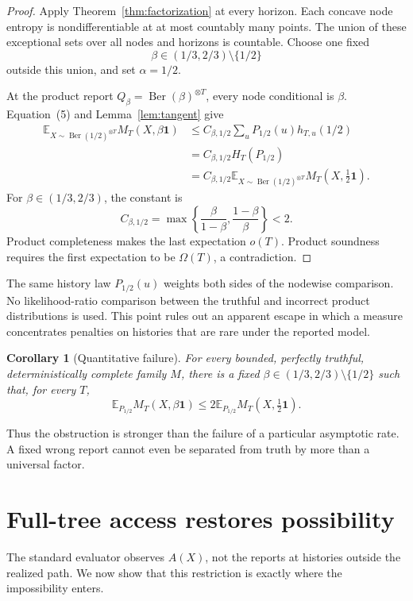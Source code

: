 \documentclass{article}
\newtheorem{corollary}[theorem]{Corollary}
\theoremstyle{definition}
\theoremstyle{remark}
\newcommand{\Ber}{\operatorname{Ber}}
\newcommand{\E}{\mathbb E}
\newcommand{\1}{\mathbf 1}
\begin{document}
\begin{proof}
Apply Theorem~\ref{thm:factorization} at every horizon. Each concave node entropy is nondifferentiable at at most countably many points. The union of these exceptional sets over all nodes and horizons is countable. Choose one fixed \[ \beta\in(1/3,2/3)\setminus\{1/2\} \] outside this union, and set \(\alpha=1/2\).

At the product report \(Q_\beta=\Ber(\beta)^{\otimes T}\), every node conditional is \(\beta\). Equation~(5) and Lemma~\ref{lem:tangent} give
\begin{align*}
\E_{X\sim\Ber(1/2)^{\otimes T}}M_T(X,\beta\1)
&\le C_{\beta,1/2}\sum_u P_{1/2}(u)h_{T,u}(1/2)\\
&=C_{\beta,1/2}H_T(P_{1/2})\\
&=C_{\beta,1/2}\E_{X\sim\Ber(1/2)^{\otimes T}}M_T(X,\tfrac12\1).
\end{align*}
For \(\beta\in(1/3,2/3)\), the constant is \[ C_{\beta,1/2}=\max\left\{\frac{\beta}{1-\beta},\frac{1-\beta}{\beta}\right\}<2. \] Product completeness makes the last expectation \(o(T)\). Product soundness requires the first expectation to be \(\Omega(T)\), a contradiction.
\end{proof}

The same history law \(P_{1/2}(u)\) weights both sides of the nodewise comparison. No likelihood-ratio comparison between the truthful and incorrect product distributions is used. This point rules out an apparent escape in which a measure concentrates penalties on histories that are rare under the reported model.

\begin{corollary}[Quantitative failure]\label{cor:quantitative}
For every bounded, perfectly truthful, deterministically complete family \(M\), there is a fixed \(\beta\in(1/3,2/3)\setminus\{1/2\}\) such that, for every \(T\), \[ \E_{P_{1/2}}M_T(X,\beta\1)\le2\E_{P_{1/2}}M_T(X,\tfrac12\1). \]
\end{corollary}

Thus the obstruction is stronger than the failure of a particular asymptotic rate. A fixed wrong report cannot even be separated from truth by more than a universal factor.

\section{Full-tree access restores possibility}

The standard evaluator observes \(A(X)\), not the reports at histories outside the realized path. We now show that this restriction is exactly where the impossibility enters.
\end{document}
